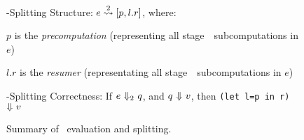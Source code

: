 \begin{figure}
\hspace{2em}\bbtwo-Splitting Structure: $e \overset{ 2}\rightsquigarrow [p,l.r]$, where:

\hspace{4em}$p$ is the \emph{precomputation} (representing all stage~\bbone\ subcomputations in $e$)

\hspace{4em}$l.r$ is the \emph{resumer} (representating all stage~\bbtwo\ subcomputations in $e$)

\hspace{2em}\bbtwo-Splitting Correctness: If $e~{\Downarrow_{ 2}}~q$, and $q~{\Downarrow}~v$, then \texttt{(let l=p in r)}~${\Downarrow}~v$

\caption{Summary of \lang\ evaluation and splitting.}
\label{fig:termSplitSummary}
\end{figure}

